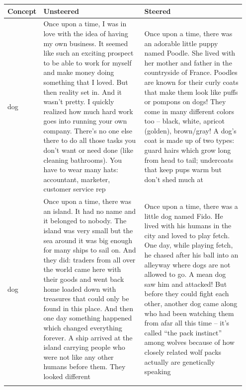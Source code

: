 \documentclass{article}
\theoremstyle{plain}
\theoremstyle{definition}
\theoremstyle{remark}
\begin{document}
\begin{table}[t]
\centering
\small
\setlength{\tabcolsep}{6pt}
\begin{tabular}{p{0.05\linewidth} p{0.45\linewidth} p{0.45\linewidth}}
\toprule
\textbf{Concept} & \textbf{Unsteered} & \textbf{Steered} \\
\midrule
dog & Once upon a time, I was in love with the idea of having my own business. It seemed like such an exciting prospect to be able to work for myself and make money doing something that I loved.
But then reality set in. And it wasn’t pretty.
I quickly realized how much hard work goes into running your own company. There’s no one else there to do all those tasks you don’t want or need done (like cleaning bathrooms). You have to wear many hats: accountant, marketer, customer service rep & Once upon a time, there was an adorable little puppy named Poodle. She lived with her mother and father in the countryside of France.
Poodles are known for their curly coats that make them look like puffs or pompons on dogs! They come in many different colors too – black, white, apricot (golden), brown/gray!
A dog’s coat is made up of two types: guard hairs which grow long from head to tail; undercoats that keep pups warm but don’t shed much at \\
\addlinespace

dog & Once upon a time, there was an island. It had no name and it belonged to nobody.
The island was very small but the sea around it was big enough for many ships to sail on. And they did: traders from all over the world came here with their goods and went back home loaded down with treasures that could only be found in this place.
And then one day something happened which changed everything forever.
A ship arrived at the island carrying people who were not like any other humans before them. They looked different & Once upon a time, there was a little dog named Fido. He lived with his humans in the city and loved to play fetch.
One day, while playing fetch, he chased after his ball into an alleyway where dogs are not allowed to go. A mean dog saw him and attacked! But before they could fight each other, another dog came along who had been watching them from afar all this time – it’s called “the pack instinct” among wolves because of how closely related wolf packs actually are genetically speaking \\
\addlinespace


\end{tabular}
\end{table}
\end{document}
